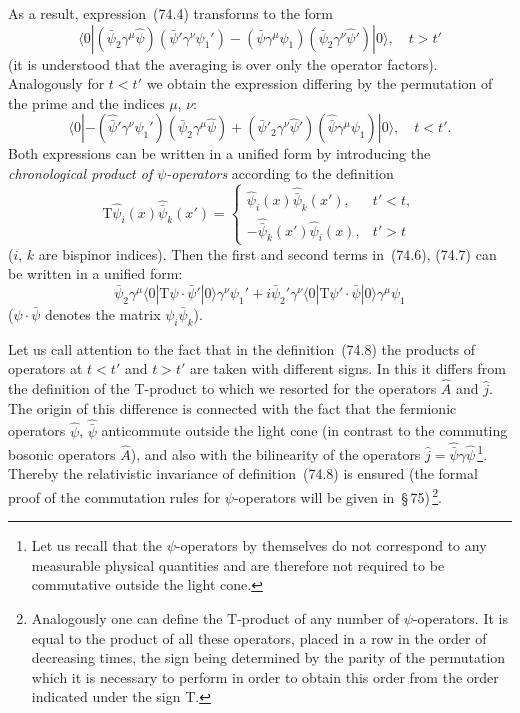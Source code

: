 As a result, expression~(74.4) transforms to the form
\begin{equation}
\langle 0|(\bar{\psi}_2\gamma^\mu\hat{\psi})(\bar{\psi}'\gamma^\nu\psi_1') - (\bar{\psi}\gamma^\mu\psi_1)(\bar{\psi}_2\gamma^\nu\hat{\psi}')|0\rangle,\quad t > t'
\tag{74.6}
\end{equation}
(it is understood that the averaging is over only the operator factors). Analogously for $t < t'$ we obtain the expression differing by the permutation of the prime and the indices $\mu$, $\nu$:
\begin{equation}
\langle 0| - (\hat{\bar{\psi}}'\gamma^\nu\psi_1')(\bar{\psi}_2\gamma^\mu\hat{\psi}) + (\bar{\psi}'_2\gamma^\nu\hat{\psi}')(\hat{\bar{\psi}}\gamma^\mu\psi_1)|0\rangle,\quad t < t'.
\tag{74.7}
\end{equation}
Both expressions can be written in a unified form by introducing the \textit{chronological product of $\psi$-operators} according to the definition
\begin{equation}
\mathrm{T}\hat{\psi}_i(x)\hat{\bar{\psi}}_k(x') = \begin{cases}\hat{\psi}_i(x)\hat{\bar{\psi}}_k(x'),& t' < t,\\[3pt] -\hat{\bar{\psi}}_k(x')\hat{\psi}_i(x),& t' > t\end{cases}
\tag{74.8}
\end{equation}
($i$, $k$ are bispinor indices). Then the first and second terms in~(74.6), (74.7) can be written in a unified form:
\begin{equation}
\bar{\psi}_2\gamma^\mu\langle 0|\mathrm{T}\psi\cdot\bar{\psi}'|0\rangle\gamma^\nu\psi_1' + i\bar{\psi}_2'\gamma^\nu\langle 0|\mathrm{T}\psi'\cdot\bar{\psi}|0\rangle\gamma^\mu\psi_1
\tag{74.9}
\end{equation}
($\psi\cdot\bar{\psi}$ denotes the matrix $\psi_i\bar{\psi}_k$).

Let us call attention to the fact that in the definition~(74.8) the products of operators at $t < t'$ and $t > t'$ are taken with different signs. In this it differs from the definition of the T-product to which we resorted for the operators $\hat{A}$ and $\hat{j}$. The origin of this difference is connected with the fact that the fermionic operators $\hat{\psi}$, $\hat{\bar{\psi}}$ anticommute outside the light cone (in contrast to the commuting bosonic operators $\hat{A}$), and also with the bilinearity of the operators $\hat{j} = \hat{\bar{\psi}}\gamma\hat{\psi}$\,\footnote{Let us recall that the $\psi$-operators by themselves do not correspond to any measurable physical quantities and are therefore not required to be commutative outside the light cone.}. Thereby the relativistic invariance of definition~(74.8) is ensured (the formal proof of the commutation rules for $\psi$-operators will be given in~\S\,75)\,\footnote{Analogously one can define the T-product of any number of $\psi$-operators. It is equal to the product of all these operators, placed in a row in the order of decreasing times, the sign being determined by the parity of the permutation which it is necessary to perform in order to obtain this order from the order indicated under the sign T.}.

